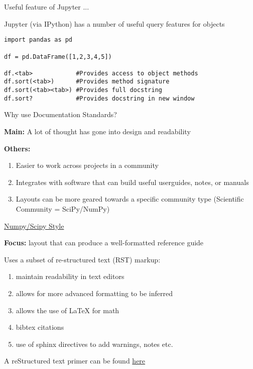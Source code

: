 \documentclass{beamer}
\begin{document}
\begin{frame}[fragile]{Useful feature of Jupyter ...}

Jupyter (via IPython) has a number of useful query features for objects

\begin{verbatim}
import pandas as pd 

df = pd.DataFrame([1,2,3,4,5])

df.<tab>            #Provides access to object methods
df.sort(<tab>)      #Provides method signature
df.sort(<tab><tab>) #Provides full docstring
df.sort?            #Provides docstring in new window
\end{verbatim}

\end{frame}


\begin{frame}{Why use Documentation Standards?}

\textbf{Main:} A lot of thought has gone into design and readability

\textbf{Others:}

\begin{enumerate}
  \item Easier to work across projects in a community
  \item Integrates with software that can build useful userguides, notes, or manuals
  \item Layouts can be more geared towards a specific community type (Scientific Community = SciPy/NumPy)
\end{enumerate}

\end{frame}

\begin{frame}{\href{https://github.com/numpy/numpy/blob/master/doc/HOWTO_DOCUMENT.rst.txt#docstring-standard}{Numpy/Scipy Style}}  

\textbf{Focus:} layout that can produce a well-formatted reference guide

Uses a subset of re-structured text (RST) markup:
\begin{enumerate}
  \item maintain readability in text editors
  \item allows for more advanced formatting to be inferred
  \item allows the use of LaTeX for math
  \item bibtex citations
  \item use of sphinx directives to add warnings, notes etc.
\end{enumerate}

A reStructured text primer can be found \href{http://www.sphinx-doc.org/en/stable/rest.html}{here}

\end{frame}
\end{document}
